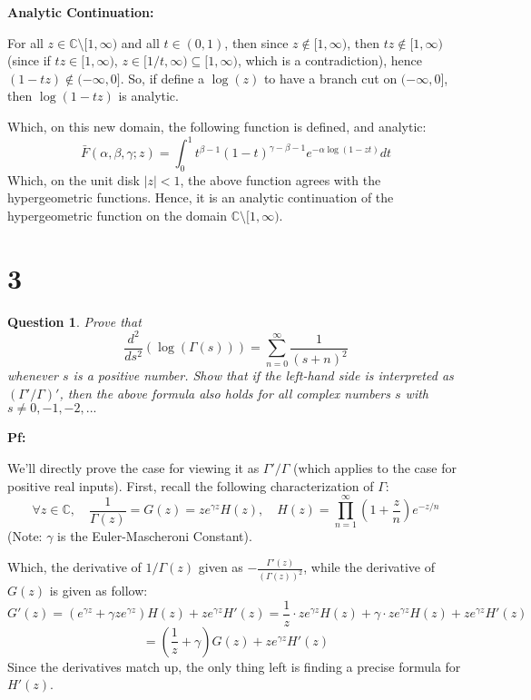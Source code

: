 \documentclass{article}
\newtheorem{question}{Question}
\begin{document}
\hfil

\textbf{Analytic Continuation:}

For all $z\in\mathbb{C}\setminus[1,\infty)$ and all $t\in (0,1)$, then since $z\notin [1,\infty)$, then $tz\notin [1,\infty)$ (since if $tz\in [1,\infty)$, $z\in [1/t,\infty)\subseteq [1,\infty)$, which is a contradiction), hence $(1-tz)\notin (-\infty,0]$.
So, if define a $\log(z)$ to have a branch cut on $(-\infty,0]$, then $\log(1-tz)$ is analytic.

Which, on this new domain, the following function is defined, and analytic:
$$\bar{F}(\alpha,\beta,\gamma;z)=\int_{0}^{1}t^{\beta-1}(1-t)^{\gamma-\beta-1}e^{-\alpha\log(1-zt)}dt$$
Which, on the unit disk $|z|<1$, the above function agrees with the hypergeometric functions. Hence, it is an analytic continuation of the hypergeometric function on the domain $\mathbb{C}\setminus[1,\infty)$.

\break

\section*{3}
\begin{myBox}[]{}
    \begin{question}
        Prove that
        $$\frac{d^2}{ds^2}(\log(\Gamma(s)))=\sum_{n=0}^{\infty}\frac{1}{(s+n)^2}$$
        whenever $s$ is a positive number. Show that if the left-hand side is interpreted
        as $(\Gamma'/\Gamma)'$, then the above formula also holds for all complex numbers $s$ with
        $s\neq 0,-1,-2,...$
    \end{question}
\end{myBox}

\textbf{Pf:}

We'll directly prove the case for viewing it as $\Gamma'/\Gamma$ (which applies to the case for positive real inputs).
First, recall the following characterization of $\Gamma$:
$$\forall z\in\mathbb{C},\quad \frac{1}{\Gamma(z)}=G(z)=ze^{\gamma z}H(z),\quad H(z)=\prod_{n=1}^{\infty}\left(1+\frac{z}{n}\right)e^{-z/n}$$
(Note: $\gamma$ is the Euler-Mascheroni Constant).

Which, the derivative of $1/\Gamma(z)$ given as $-\frac{\Gamma'(z)}{(\Gamma(z))^2}$, while the derivative of $G(z)$ is given as follow:
$$G'(z)=\left(e^{\gamma z}+\gamma ze^{\gamma z}\right)H(z)+ze^{\gamma z}H'(z) = \frac{1}{z}\cdot ze^{\gamma z}H(z)+\gamma\cdot ze^{\gamma z}H(z)+ze^{\gamma z}H'(z)$$
$$ = \left(\frac{1}{z}+\gamma\right)G(z)+ze^{\gamma z}H'(z)$$
Since the derivatives match up, the only thing left is finding a precise formula for $H'(z)$.
\end{document}
